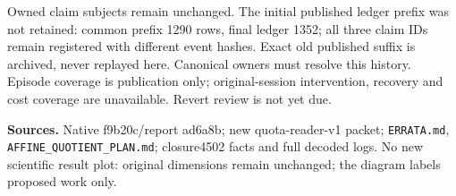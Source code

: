 \documentclass[10pt]{article}
\begin{document}
Owned claim subjects remain unchanged. The initial published ledger prefix
was not retained: common prefix 1290 rows, final ledger 1352; all three claim
IDs remain registered with different event hashes. Exact old published suffix
is archived, never replayed here. Canonical owners must resolve this history.
Episode coverage is publication only; original-session intervention, recovery
and cost coverage are unavailable. Revert review is not yet due.

\textbf{Sources.} Native f9b20c/report ad6a8b; new quota-reader-v1 packet;
\texttt{ERRATA.md}, \texttt{AFFINE\_QUOTIENT\_PLAN.md}; closure4502 facts and
full decoded logs. No new scientific result plot: original dimensions remain
unchanged; the diagram labels proposed work only.
\end{document}
